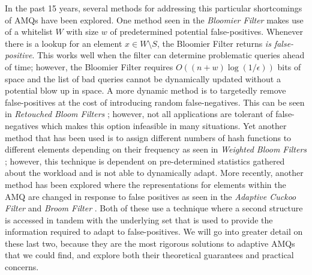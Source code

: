 \documentclass[../paper.tex]{subfiles}
\begin{document}
In the past 15 years, several methods for addressing this particular shortcomings of AMQs have been explored.  
One method seen in the {\it Bloomier Filter} \cite{bloomier-filter} makes use of a whitelist 
$W$ with size $w$ of predetermined potential false-positives.  Whenever there is a lookup 
for an element $x \in W \setminus S$, the Bloomier Filter returns \textit{is false-positive}.   
This works well when the filter can determine problematic queries ahead of time; however, the 
Bloomier Filter requires $O((n+w)\log(1/\epsilon))$ bits of space and the list of bad queries 
cannot be dynamically updated without a potential blow up in space. A more dynamic 
method is to targetedly remove false-positives at the cost of 
introducing random false-negatives.  This can be seen in {\it Retouched Bloom Filters} 
\cite{retouched-filter}; however, not all applications are tolerant of false-negatives 
which makes this option infeasible in many situations.  Yet another method 
that has been used is to assign different numbers of hash functions to different elements
depending on their frequency as seen in {\it Weighted Bloom Filters} \cite{weighted-filter};
however, this technique is dependent on pre-determined statistics gathered about the workload and is not able to dynamically
adapt.  More recently, another method has been explored where the representations for 
elements within the AMQ are changed in response to false positives as seen in the {\it 
Adaptive Cuckoo Filter} \cite{adaptive-cuckoo} and {\it Broom Filter} \cite{broom-filter}. 
Both of these use a technique where a second structure is accessed in tandem 
with the underlying set that is used to provide the information required to adapt to 
false-positives.  We will go into greater detail on these last two, because they are the most
rigorous solutions to adaptive AMQs that we could find, and explore both their theoretical guarantees
and practical concerns.  
\end{document}
